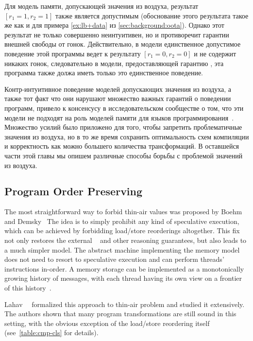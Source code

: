 Для модель памяти, допускающей значения из воздуха, 
результат ${[r_1=1, r_2=1]}$ также является допустимым
(обоснование этого результата такое же как и для 
примера \ref{ex:lb+data} из \cref{sec:background:oota}).
Однако этот результат не только совершенно неинтуитивен, 
но и противоречит гарантии внешней свободы от гонок. 
Действительно, в модели \SC единственное допустимое 
поведение этой программы ведет к результату $[r_1=0, r_2=0]$ 
и не содержит никаких гонок, следовательно 
в модели, предоставляющей гарантию \eDRF, 
эта программа также должа иметь только это единственное поведение. 

Контр-интуитивное поведение моделей 
допускающих значения из воздуха, 
а также тот факт что они нарушают множество 
важных гарантий о поведении программ, 
привело к консенсусу в исследовательском сообществе о том, 
что эти модели не подходят на роль моделей памяти 
для языков программирования~\cite{Boehm-Demsky:MSPC14, Batty-al:ESOP15}.  
Множество усилий было приложено для того, 
чтобы запретить проблематичные значения из воздуха, 
но в то же время сохранить оптимальность схем 
компиляции и корректность как можно большего количества трансформаций. 
В оставшейся части этой главы мы опишем различные 
способы борьбы с проблемой значений из воздуха. 

\subsection{Program Order Preserving}
\label{sec:analysis:porf}

The most straightforward way to forbid thin-air values 
was proposed by Boehm and Demsky~\cite{Boehm-Demsky:MSPC14}
The idea is to simply prohibit any kind of speculative execution, 
which can be achieved by forbidding load/store reorderings altogether. 
This fix not only restores the external \DRF~\cite{Lahav-al:PLDI17}
and other reasoning guarantees, but also leads to 
a much simpler model. The abstract machine implementing 
the memory model does not need to resort to speculative execution 
and can perform threads' instructions in-order. 
A memory storage can be implemented as a 
monotonically growing history of messages, 
with each thread having its own view on 
a frontier of this history~\cite{Dolan-al:PLDI18, Doherty-al:PPoPP19}.

Lahav~\etal~\cite{Lahav-al:PLDI17} formalized this approach
to thin-air problem and studied it extensively. 
The authors shown that many program transformations 
are still sound in this setting, 
with the obvious exception of the load/store reordering itself
(see~\cref{table:cmp-cls} for details).

